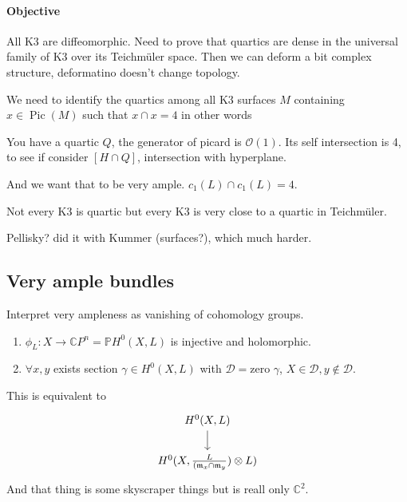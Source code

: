 \paragraph{Objective} All K3 are diffeomorphic. Need to prove that quartics are dense in the universal family of K3 over its Teichmüler space. Then we can deform a bit complex structure, deformatino doesn't change topology.


We need to identify the quartics among all K3 surfaces $M$ containing $x\in\operatorname{Pic}(M)$ such that $x\cap x=4$ in other words 

You have a quartic $Q$, the generator of picard is $\mathcal{O}(1)$. Its self intersection is 4, to see if consider $[H\cap Q]$, intersection with hyperplane.

And we want that to be very ample. $c_1(L)\cap c_1(L)=4$.

\begin{remark}[Dani]\leavevmode
	Not every K3 is quartic but every K3 is very close to a quartic in Teichmüler.
\end{remark}

\begin{remark}
	Pellisky? did it with Kummer (surfaces?), which much harder.
\end{remark}

\subsection{Very ample bundles}
Interpret very ampleness as vanishing of cohomology groups.

\begin{claim}\leavevmode
	\begin{enumerate}[label=(\roman*)]
		\item $\phi_L:X\to \mathbb{C}P^{n}=\mathbb{P}H^{0}(X,L)$ is injective and holomorphic.
		\item $\forall x,y$ exists section $\gamma \in H^{0}(X,L)$ with $\mathcal{D}=$zero $\gamma$, $X\in\mathcal{D}, y \not\in\mathcal{D}$.
	\end{enumerate}
\end{claim}

This is equivalent to
\[\begin{tikzcd}
H^{0}(X,L)\arrow[d]\\
H^{0}(X,\frac{L}{(\mathfrak{m}_x\cap \mathfrak{m}_y})\otimes L)
\end{tikzcd}\]
And that thing is some skyscraper things but is reall only $\mathbb{C}^2$.


